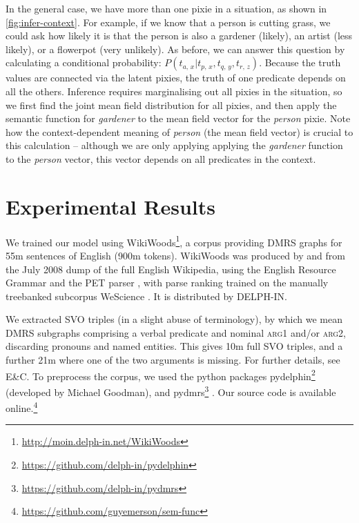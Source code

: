 \documentclass[a4paper,11pt]{article}
\begin{document}
In the general case, we have more than one pixie in a situation,
as shown in \cref{fig:infer-context}.
For example, if we know that a person is cutting grass,
we could ask how likely it is that the person is also
a gardener (likely), an artist (less likely), or a flowerpot (very unlikely).
As before, we can answer this question by calculating a conditional probability:
${P(t_{a,\,x}|t_{p,\,x},t_{q,\,y},t_{r,\,z})}$.
Because the truth values are connected via the latent pixies,
the truth of one predicate depends on all the others.
Inference requires marginalising out all pixies in the situation,
so we first find the joint mean field distribution for all pixies,
and then apply the semantic function for \textit{gardener}
to the mean field vector for the \textit{person} pixie.
Note how the context-dependent meaning of \textit{person}
(the mean field vector)
is crucial to this calculation --
although we are only applying applying the \textit{gardener} function
to the \textit{person} vector,
this vector depends on all predicates in the context.



\section{Experimental Results}
\label{sec:eval}

We trained our model using WikiWoods\footnote{\url{http://moin.delph-in.net/WikiWoods}},
a corpus providing DMRS graphs for 55m sentences of English (900m tokens).
WikiWoods was produced by \citet{flickinger2010wikiwoods} and \citet{solberg2012wikiwoods}
from the July 2008 dump of the full English Wikipedia,
using the English Resource Grammar \citep{flickinger2000erg,flickinger2011erg}
and the PET parser \citep{callmeier2001pet,toutanova2005pet},
with parse ranking trained on the manually treebanked subcorpus WeScience \citep{ytrestol2009wescience}.
It is distributed by DELPH-IN.

We extracted SVO triples (in a slight abuse of terminology),
by which we mean DMRS subgraphs comprising a verbal predicate
and nominal \textsc{arg1} and/or \textsc{arg2},
discarding pronouns and named entities.
This gives 10m full SVO triples,
and a further 21m where one of the two arguments is missing.
For further details, see E\&C.
To preprocess the corpus, we used the python packages
pydelphin\footnote{\url{https://github.com/delph-in/pydelphin}} (developed by Michael Goodman),
and pydmrs\footnote{\url{https://github.com/delph-in/pydmrs}} \citep{copestake2016pydmrs}.
Our source code is available online.\footnote{\url{https://github.com/guyemerson/sem-func}}
\end{document}
